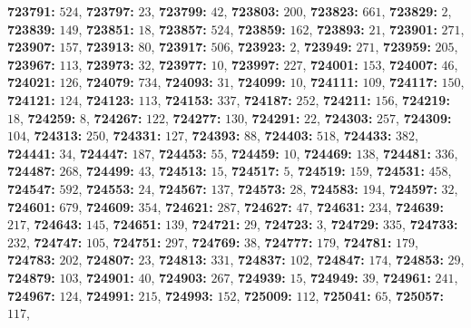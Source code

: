 \textsf{\bfseries 723791:} $524$, \textsf{\bfseries 723797:} $23$, \textsf{\bfseries 723799:} $42$, \textsf{\bfseries 723803:} $200$, \textsf{\bfseries 723823:} $661$, \textsf{\bfseries 723829:} $2$, \textsf{\bfseries 723839:} $149$, \textsf{\bfseries 723851:} $18$, \textsf{\bfseries 723857:} $524$, \textsf{\bfseries 723859:} $162$, \textsf{\bfseries 723893:} $21$, \textsf{\bfseries 723901:} $271$, \textsf{\bfseries 723907:} $157$, \textsf{\bfseries 723913:} $80$, \textsf{\bfseries 723917:} $506$, \textsf{\bfseries 723923:} $2$, \textsf{\bfseries 723949:} $271$, \textsf{\bfseries 723959:} $205$, \textsf{\bfseries 723967:} $113$, \textsf{\bfseries 723973:} $32$, \textsf{\bfseries 723977:} $10$, \textsf{\bfseries 723997:} $227$, \textsf{\bfseries 724001:} $153$, \textsf{\bfseries 724007:} $46$, \textsf{\bfseries 724021:} $126$, \textsf{\bfseries 724079:} $734$, \textsf{\bfseries 724093:} $31$, \textsf{\bfseries 724099:} $10$, \textsf{\bfseries 724111:} $109$, \textsf{\bfseries 724117:} $150$, \textsf{\bfseries 724121:} $124$, \textsf{\bfseries 724123:} $113$, \textsf{\bfseries 724153:} $337$, \textsf{\bfseries 724187:} $252$, \textsf{\bfseries 724211:} $156$, \textsf{\bfseries 724219:} $18$, \textsf{\bfseries 724259:} $8$, \textsf{\bfseries 724267:} $122$, \textsf{\bfseries 724277:} $130$, \textsf{\bfseries 724291:} $22$, \textsf{\bfseries 724303:} $257$, \textsf{\bfseries 724309:} $104$, \textsf{\bfseries 724313:} $250$, \textsf{\bfseries 724331:} $127$, \textsf{\bfseries 724393:} $88$, \textsf{\bfseries 724403:} $518$, \textsf{\bfseries 724433:} $382$, \textsf{\bfseries 724441:} $34$, \textsf{\bfseries 724447:} $187$, \textsf{\bfseries 724453:} $55$, \textsf{\bfseries 724459:} $10$, \textsf{\bfseries 724469:} $138$, \textsf{\bfseries 724481:} $336$, \textsf{\bfseries 724487:} $268$, \textsf{\bfseries 724499:} $43$, \textsf{\bfseries 724513:} $15$, \textsf{\bfseries 724517:} $5$, \textsf{\bfseries 724519:} $159$, \textsf{\bfseries 724531:} $458$, \textsf{\bfseries 724547:} $592$, \textsf{\bfseries 724553:} $24$, \textsf{\bfseries 724567:} $137$, \textsf{\bfseries 724573:} $28$, \textsf{\bfseries 724583:} $194$, \textsf{\bfseries 724597:} $32$, \textsf{\bfseries 724601:} $679$, \textsf{\bfseries 724609:} $354$, \textsf{\bfseries 724621:} $287$, \textsf{\bfseries 724627:} $47$, \textsf{\bfseries 724631:} $234$, \textsf{\bfseries 724639:} $217$, \textsf{\bfseries 724643:} $145$, \textsf{\bfseries 724651:} $139$, \textsf{\bfseries 724721:} $29$, \textsf{\bfseries 724723:} $3$, \textsf{\bfseries 724729:} $335$, \textsf{\bfseries 724733:} $232$, \textsf{\bfseries 724747:} $105$, \textsf{\bfseries 724751:} $297$, \textsf{\bfseries 724769:} $38$, \textsf{\bfseries 724777:} $179$, \textsf{\bfseries 724781:} $179$, \textsf{\bfseries 724783:} $202$, \textsf{\bfseries 724807:} $23$, \textsf{\bfseries 724813:} $331$, \textsf{\bfseries 724837:} $102$, \textsf{\bfseries 724847:} $174$, \textsf{\bfseries 724853:} $29$, \textsf{\bfseries 724879:} $103$, \textsf{\bfseries 724901:} $40$, \textsf{\bfseries 724903:} $267$, \textsf{\bfseries 724939:} $15$, \textsf{\bfseries 724949:} $39$, \textsf{\bfseries 724961:} $241$, \textsf{\bfseries 724967:} $124$, \textsf{\bfseries 724991:} $215$, \textsf{\bfseries 724993:} $152$, \textsf{\bfseries 725009:} $112$, \textsf{\bfseries 725041:} $65$, \textsf{\bfseries 725057:} $117$, 
